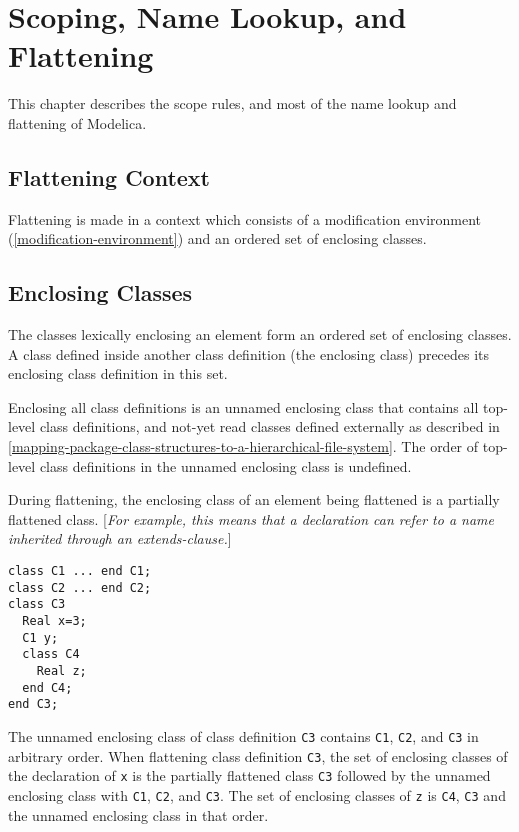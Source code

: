 \chapter{Scoping, Name Lookup, and Flattening}

This chapter describes the scope rules, and most of the name lookup and
flattening of Modelica.

\section{Flattening Context}

Flattening is made in a context which consists of a modification
environment (\autoref{modification-environment}) and an ordered set of enclosing classes.

\section{Enclosing Classes}

The classes lexically enclosing an element form an ordered set of
enclosing classes. A class defined inside another class definition (the
enclosing class) precedes its enclosing class definition in this set.

Enclosing all class definitions is an unnamed enclosing class that
contains all top-level class definitions, and not-yet read classes
defined externally as described in \autoref{mapping-package-class-structures-to-a-hierarchical-file-system}. The order of
top-level class definitions in the unnamed enclosing class is undefined.

During flattening, the enclosing class of an element being flattened is
a partially flattened class. {[}\emph{For example, this means that a
declaration can refer to a name inherited through an extends-clause.}{]}

\begin{example}
\begin{lstlisting}[language=modelica]
class C1 ... end C1;
class C2 ... end C2;
class C3
  Real x=3;
  C1 y;
  class C4
    Real z;
  end C4;
end C3;
\end{lstlisting}

The unnamed enclosing class of class definition \lstinline!C3! contains \lstinline!C1!,
\lstinline!C2!, and \lstinline!C3! in arbitrary order. When flattening class definition \lstinline!C3!, the
set of enclosing classes of the declaration of \lstinline!x! is the partially
flattened class \lstinline!C3! followed by the unnamed enclosing class with \lstinline!C1!, \lstinline!C2!,
and \lstinline!C3!. The set of enclosing classes of \lstinline!z! is \lstinline!C4!, \lstinline!C3! and the unnamed
enclosing class in that order.
\end{example}


